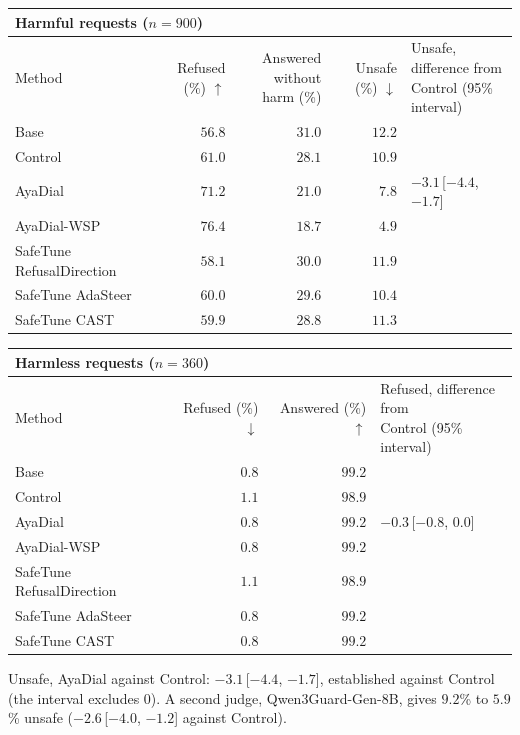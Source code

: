 \documentclass[10pt,a4paper]{article}
\renewcommand{\arraystretch}{1.12}
\begin{document}
\begin{table}[H]\centering\small\renewcommand{\arraystretch}{1.25}\begin{tabular}{|l|r|r|r|l|}\hline
\multicolumn{5}{|l|}{\textbf{Harmful requests ($n = 900$)}}\\\hline
Method & Refused (\%) $\uparrow$ & \makecell[r]{Answered without\\harm (\%)} & Unsafe (\%) $\downarrow$ & \makecell[l]{Unsafe, difference from\\Control (95\% interval)}\\\hline
Base & $56.8$ & $31.0$ & $12.2$ & \\\hline
Control & $61.0$ & $28.1$ & $10.9$ & \\\hline
AyaDial & $71.2$ & $21.0$ & $7.8$ & $-3.1$\,[$-4.4$, $-1.7$]\\\hline
AyaDial-WSP & \cellcolor{win}$\mathbf{76.4}$ & $18.7$ & \cellcolor{win}$\mathbf{4.9}$ & \\\hline
SafeTune RefusalDirection & $58.1$ & $30.0$ & $11.9$ & \\\hline
SafeTune AdaSteer & $60.0$ & $29.6$ & $10.4$ & \\\hline
SafeTune CAST & $59.9$ & $28.8$ & $11.3$ & \\\hline
\end{tabular}\end{table}
\begin{table}[H]\centering\small\renewcommand{\arraystretch}{1.25}\begin{tabular}{|l|r|r|l|}\hline
\multicolumn{4}{|l|}{\textbf{Harmless requests ($n = 360$)}}\\\hline
Method & Refused (\%) $\downarrow$ & Answered (\%) $\uparrow$ & \makecell[l]{Refused, difference from\\Control (95\% interval)}\\\hline
Base & $0.8$ & $99.2$ & \\\hline
Control & $1.1$ & $98.9$ & \\\hline
AyaDial & $0.8$ & $99.2$ & $-0.3$\,[$-0.8$, $0.0$]\\\hline
AyaDial-WSP & $0.8$ & $99.2$ & \\\hline
SafeTune RefusalDirection & $1.1$ & $98.9$ & \\\hline
SafeTune AdaSteer & $0.8$ & $99.2$ & \\\hline
SafeTune CAST & $0.8$ & $99.2$ & \\\hline
\end{tabular}\end{table}
Unsafe, AyaDial against Control: $-3.1$\,[$-4.4$, $-1.7$], established against Control (the interval excludes 0). A second judge, Qwen3Guard-Gen-8B, gives $9.2$\% to $5.9$\% unsafe ($-2.6$\,[$-4.0$, $-1.2$] against Control).
\end{document}
